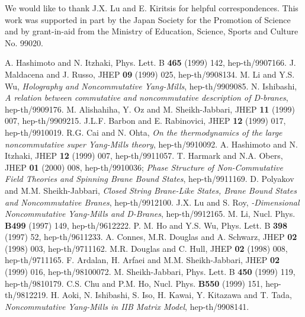 \documentclass[a4paper,12pt]{article}
\begin{document}
We would like to thank J.X. Lu and E. Kiritsis for helpful correspondences.
This work was supported in part by the Japan Society for the Promotion of
Science and by grant-in-aid from the Ministry of Education, Science,
Sports and Culture No. 99020.


\newpage
\begin{thebibliography}{99}
A. Hashimoto and N. Itzhaki, Phys. Lett. B {\bf 465}
  (1999) 142, hep-th/9907166.
J. Maldacena and J. Russo, JHEP {\bf 09} (1999) 025,
  hep-th/9908134.
M. Li and Y.S. Wu, {\it Holography and
  Noncommutative Yang-Mills}, hep-th/9909085.
N. Ishibashi, {\it A relation between commutative and
  noncommutative description of D-branes}, hep-th/9909176.
M. Alishahiha, Y. Oz and M. Sheikh-Jabbari, JHEP {\bf 11}
  (1999) 007, hep-th/9909215.
J.L.F. Barbon and E. Rabinovici, JHEP {\bf 12} (1999) 017,
  hep-th/9910019.
R.G. Cai and N. Ohta, {\it On the thermodynamics of the
  large \coordHE{} noncommutative super Yang-Mills theory}, hep-th/9910092.
A. Hashimoto and N. Itzhaki, JHEP {\bf 12} (1999) 007,
  hep-th/9911057.
 T. Harmark and N.A. Obers, JHEP {\bf 01} (2000) 008,
  hep-th/9910036; {\it Phase Structure of Non-Commutative Field Theories
  and Spinning Brane Bound States}, hep-th/9911169.
D. Polyakov and M.M. Sheikh-Jabbari, {\it Closed String
  Brane-Like States, Brane Bound States and Noncommutative Branes},
  hep-th/9912100.
J.X. Lu and S. Roy, {\it {}\coordHE{}-Dimensional Noncommutative
  Yang-Mills and D\coordHE{}-Branes}, hep-th/9912165.
 M. Li, Nucl. Phys. {\bf B499} (1997) 149, hep-th/9612222.
 P. M. Ho and Y.S. Wu, Phys. Lett. B {\bf 398} (1997) 52,
  hep-th/9611233.
 A. Connes, M.R. Douglas and A. Schwarz, JHEP {\bf 02}
  (1998) 003, hep-th/9711162.
 M.R. Douglas and C. Hull, JHEP {\bf 02} (1998) 008,
  hep-th/9711165.
 F. Ardalan, H. Arfaei and M.M. Sheikh-Jabbari, JHEP
  {\bf 02} (1999) 016, hep-th/98100072.
 M. Sheikh-Jabbari, Phys. Lett. B {\bf 450} (1999) 119,
  hep-th/9810179.
C.S. Chu and P.M. Ho, Nucl. Phys. {\bf B550} (1999) 151,
  hep-th/9812219.
 H. Aoki, N. Ishibashi, S. Iso, H. Kawai, Y. Kitazawa and
  T. Tada, {\it Noncommutative Yang-Mills in IIB Matrix Model}, hep-th/9908141.

\end{thebibliography}
\end{document}
